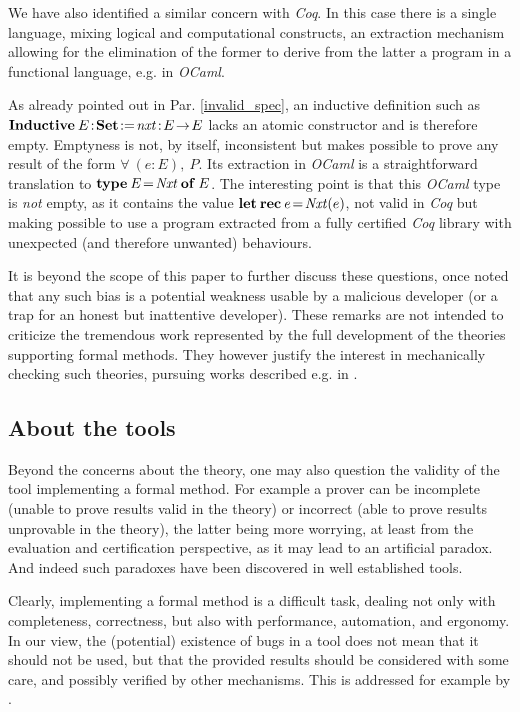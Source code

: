 \documentclass[conference]{IEEEtran}
\begin{document}
We have also identified a similar concern with \emph{Coq}. In this case there is a single
language, mixing logical and computational constructs, an extraction mechanism allowing for
the elimination of the former to derive from the latter a program in a functional language,
e.g. in \emph{OCaml}.

As already pointed out in Par. \ref{invalid_spec}, an inductive definition such as
{\small$\Cmd{Inductive}\:E\!:\!\Cmd{Set}\!:=\!\fid{nxt}\!:\!E\!\to\!E$} lacks an atomic
constructor and is therefore empty. Emptyness is not, by itself, inconsistent but makes
possible to prove any result of the form {\small$\forall\:(e\!:\!E),\:P$}. Its extraction in
\emph{OCaml} is a straightforward translation to
{\small$\mathbf{type}\:E\!=\!\textrm{\emph{Nxt}}\:\mathbf{of}\:E$}. The interesting point is that this
\emph{OCaml} type is \emph{not} empty, as it contains the value
{\small$\mathbf{let}\:\mathbf{rec}\:e\!=\!\textrm{\emph{Nxt}}(e)$}, not valid in \emph{Coq} but making
possible to use a program extracted from a fully certified \emph{Coq} library with unexpected
(and therefore unwanted) behaviours.

It is beyond the scope of this paper to further discuss these questions, once noted that any
such bias is a potential weakness usable by a malicious developer (or a trap for an honest
but inattentive developer). These remarks are not intended to criticize the tremendous work
represented by the full development of the theories supporting formal methods. They however
justify the interest in mechanically checking such theories, pursuing works described e.g. in
\cite{cha:1,bod:1b,Barras99}.

\subsection{About the tools}\label{tool_error}

Beyond the concerns about the theory, one may also question the validity of the tool
implementing a formal method. For example a prover can be incomplete (unable to prove results
valid in the theory) or incorrect (able to prove results unprovable in the theory), the latter
being more worrying, at least from the evaluation and certification perspective, as it may
lead to an artificial paradox. And indeed such paradoxes have been discovered in well
established tools.

Clearly, implementing a formal method is a difficult task, dealing not only with completeness,
correctness, but also with performance, automation, and ergonomy. In our view, the (potential)
existence of bugs in a tool does not mean that it should not be used, but that the provided
results should be considered with some care, and possibly verified by other mechanisms. This
is addressed for example by \cite{DBLP:conf/lpar/JaegerD07,rid:1}.
\end{document}
